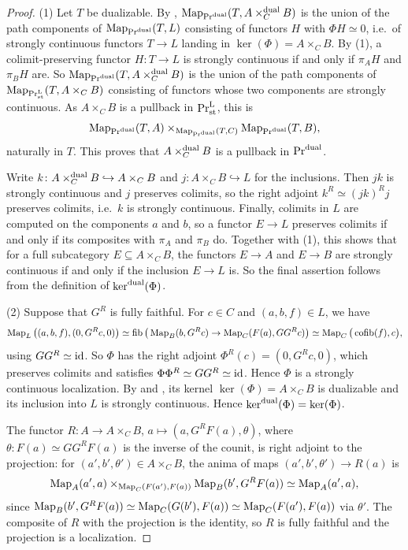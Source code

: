 	\begin{proof}
		(1) Let $T$ be dualizable. By , $\operatorname{Map}_{\textup{Pr}^{\operatorname{dual}}}(T,A \times^{\operatorname{dual}}_C B)$ is the union of the path components of $\operatorname{Map}_{\textup{Pr}^{\operatorname{dual}}}(T,L)$ consisting of functors $H$ with $\Phi H \simeq 0$, i.e.\ of strongly continuous functors $T \to L$ landing in $\ker(\Phi) = A \times_C B$. By (1), a colimit-preserving functor $H\colon T \to L$ is strongly continuous if and only if $\pi_AH$ and $\pi_BH$ are. So $\operatorname{Map}_{\textup{Pr}^{\operatorname{dual}}}(T,A \times^{\operatorname{dual}}_C B)$ is the union of the path components of $\operatorname{Map}_{\textup{Pr}^{\textup{L}}_{\operatorname{st}}}(T,A \times_C B)$ consisting of functors whose two components are strongly continuous. As $A \times_C B$ is a pullback in $\textup{Pr}^{\textup{L}}_{\operatorname{st}}$, this is
		\[
			\operatorname{Map}_{\textup{Pr}^{\operatorname{dual}}}(T,A) \times_{\operatorname{Map}_{\textup{Pr}^{\operatorname{dual}}}(T,C)} \operatorname{Map}_{\textup{Pr}^{\operatorname{dual}}}(T,B),
		\]
		naturally in $T$. This proves that $A \times^{\operatorname{dual}}_C B$ is a pullback in $\textup{Pr}^{\operatorname{dual}}$.

		Write $k\colon A \times^{\operatorname{dual}}_C B \hookrightarrow A \times_C B$ and $j\colon A \times_C B \hookrightarrow L$ for the inclusions. Then $jk$ is strongly continuous and $j$ preserves colimits, so the right adjoint $k^R \simeq (jk)^R j$ preserves colimits, i.e.\ $k$ is strongly continuous. Finally, colimits in $L$ are computed on the components $a$ and $b$, so a functor $E \to L$ preserves colimits if and only if its composites with $\pi_A$ and $\pi_B$ do. Together with (1), this shows that for a full subcategory $E \subseteq A \times_C B$, the functors $E \to A$ and $E \to B$ are strongly continuous if and only if the inclusion $E \to L$ is. So the final assertion follows from the definition of $\ker^{\operatorname{dual}}(\Phi)$.

		(2) Suppose that $G^R$ is fully faithful. For $c \in C$ and $(a,b,f) \in L$, we have
		\[
			\operatorname{Map}_L\big((a,b,f),(0,G^Rc,0)\big) \simeq \operatorname{fib}\big(\operatorname{Map}_B(b,G^Rc) \to \operatorname{Map}_C(F(a),GG^Rc)\big) \simeq \operatorname{Map}_C\big(\operatorname{cofib}(f),c\big),
		\]
		using $GG^R \simeq \operatorname{id}$. So $\Phi$ has the right adjoint $\Phi^R(c) = (0,G^Rc,0)$, which preserves colimits and satisfies $\Phi\Phi^R \simeq GG^R \simeq \operatorname{id}$. Hence $\Phi$ is a strongly continuous localization. By  and , its kernel $\ker(\Phi) = A \times_C B$ is dualizable and its inclusion into $L$ is strongly continuous. Hence $\ker^{\operatorname{dual}}(\Phi) = \ker(\Phi)$.

		The functor $R\colon A \to A \times_C B$, $a \mapsto (a,G^RF(a),\theta)$, where $\theta\colon F(a) \simeq GG^RF(a)$ is the inverse of the counit, is right adjoint to the projection: for $(a',b',\theta') \in A \times_C B$, the anima of maps $(a',b',\theta') \to R(a)$ is
		\[
			\operatorname{Map}_A(a',a) \times_{\operatorname{Map}_C(F(a'),F(a))} \operatorname{Map}_B(b',G^RF(a)) \simeq \operatorname{Map}_A(a',a),
		\]
		since $\operatorname{Map}_B(b',G^RF(a)) \simeq \operatorname{Map}_C(G(b'),F(a)) \simeq \operatorname{Map}_C(F(a'),F(a))$ via $\theta'$. The composite of $R$ with the projection is the identity, so $R$ is fully faithful and the projection is a localization.
	\end{proof}

